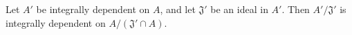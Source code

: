 Let $A'$ be integrally dependent on $A$, and let $\mathfrak{J}'$ be an ideal in $A'$. Then $A'/\mathfrak{J}'$ is integrally dependent on $A/(\mathfrak{J}' \cap A)$.

